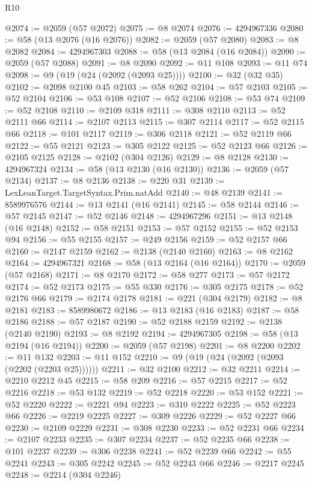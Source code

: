 \begin{lexlean}{R10}
\begin{coremodule}
@2074 := @2059 (@57 @2072)
@2075 := @8 @2074
@2076 := 4294967336
@2080 := @58 (@13 @2076 (@16 @2076))
@2082 := @2059 (@57 @2080)
@2083 := @8 @2082
@2084 := 4294967303
@2088 := @58 (@13 @2084 (@16 @2084))
@2090 := @2059 (@57 @2088)
@2091 := @8 @2090
@2092 := @11 @108
@2093 := @11 @74
@2098 := @9 (@19 (@24 (@2092 (@2093 @25))))
@2100 := @32 (@32 @35)
@2102 := @2098 @2100 @45
@2103 := @58 @262
@2104 := @57 @2103
@2105 := @52 @2104
@2106 := @53 @108
@2107 := @52 @2106
@2108 := @53 @74
@2109 := @52 @2108
@2110 := @2109 @318
@2111 := @308 @2110
@2113 := @52 @2111 @66
@2114 := @2107 @2113
@2115 := @307 @2114
@2117 := @52 @2115 @66
@2118 := @101 @2117
@2119 := @306 @2118
@2121 := @52 @2119 @66
@2122 := @55 @2121
@2123 := @305 @2122
@2125 := @52 @2123 @66
@2126 := @2105 @2125
@2128 := @2102 (@304 @2126)
@2129 := @8 @2128
@2130 := 4294967324
@2134 := @58 (@13 @2130 (@16 @2130))
@2136 := @2059 (@57 @2134)
@2137 := @8 @2136
@2138 := @220 @31
@2139 := LexLeanTarget.TargetSyntax.Prim.natAdd
@2140 := @48 @2139
@2141 := 8589976576
@2144 := @13 @2141 (@16 @2141)
@2145 := @58 @2144
@2146 := @57 @2145
@2147 := @52 @2146
@2148 := 4294967296
@2151 := @13 @2148 (@16 @2148)
@2152 := @58 @2151
@2153 := @57 @2152
@2155 := @52 @2153 @94
@2156 := @55 @2155
@2157 := @249 @2156
@2159 := @52 @2157 @66
@2160 := @2147 @2159
@2162 := @2138 (@2140 @2160)
@2163 := @8 @2162
@2164 := 4294967321
@2168 := @58 (@13 @2164 (@16 @2164))
@2170 := @2059 (@57 @2168)
@2171 := @8 @2170
@2172 := @58 @277
@2173 := @57 @2172
@2174 := @52 @2173
@2175 := @55 @330
@2176 := @305 @2175
@2178 := @52 @2176 @66
@2179 := @2174 @2178
@2181 := @221 (@304 @2179)
@2182 := @8 @2181
@2183 := 8589980672
@2186 := @13 @2183 (@16 @2183)
@2187 := @58 @2186
@2188 := @57 @2187
@2190 := @52 @2188 @2159
@2192 := @2138 (@2140 @2190)
@2193 := @8 @2192
@2194 := 4294967305
@2198 := @58 (@13 @2194 (@16 @2194))
@2200 := @2059 (@57 @2198)
@2201 := @8 @2200
@2202 := @11 @132
@2203 := @11 @152
@2210 := @9 (@19 (@24 (@2092 (@2093 (@2202 (@2203 @25))))))
@2211 := @32 @2100
@2212 := @32 @2211
@2214 := @2210 @2212 @45
@2215 := @58 @209
@2216 := @57 @2215
@2217 := @52 @2216
@2218 := @53 @132
@2219 := @52 @2218
@2220 := @53 @152
@2221 := @52 @2220
@2222 := @2221 @94
@2223 := @310 @2222
@2225 := @52 @2223 @66
@2226 := @2219 @2225
@2227 := @309 @2226
@2229 := @52 @2227 @66
@2230 := @2109 @2229
@2231 := @308 @2230
@2233 := @52 @2231 @66
@2234 := @2107 @2233
@2235 := @307 @2234
@2237 := @52 @2235 @66
@2238 := @101 @2237
@2239 := @306 @2238
@2241 := @52 @2239 @66
@2242 := @55 @2241
@2243 := @305 @2242
@2245 := @52 @2243 @66
@2246 := @2217 @2245
@2248 := @2214 (@304 @2246)

\end{coremodule}
\end{lexlean}
